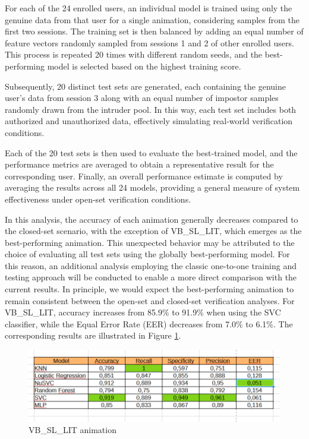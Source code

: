 \documentclass{article}
\begin{document}
For each of the 24 enrolled users, an individual model is trained using only the genuine data from that user for a single animation, considering samples from the first two sessions.
The training set is then balanced by adding an equal number of feature vectors randomly sampled from sessions 1 and 2 of other enrolled users.
This process is repeated 20 times with different random seeds, and the best-performing model is selected based on the highest training score.

Subsequently, 20 distinct test sets are generated, each containing the genuine user's data from session 3 along with an equal number of impostor samples randomly drawn from the intruder pool.
In this way, each test set includes both authorized and unauthorized data, effectively simulating real-world verification conditions.

Each of the 20 test sets is then used to evaluate the best-trained model, and the performance metrics are averaged to obtain a representative result for the corresponding user.
Finally, an overall performance estimate is computed by averaging the results across all 24 models, providing a general measure of system effectiveness under open-set verification conditions.

In this analysis, the accuracy of each animation generally decreases compared to the closed-set scenario, with the exception of VB\_SL\_LIT, which emerges as the best-performing animation.
This unexpected behavior may be attributed to the choice of evaluating all test sets using the globally best-performing model.
For this reason, an additional analysis employing the classic one-to-one training and testing approach will be conducted to enable a more direct comparison with the current results.
In principle, we would expect the best-performing animation to remain consistent between the open-set and closed-set verification analyses.
For VB\_SL\_LIT, accuracy increases from 85.9\% to 91.9\% when using the SVC classifier, while the Equal Error Rate (EER) decreases from 7.0\% to 6.1\%.
The corresponding results are illustrated in Figure \ref{fig:VB_SL_LIT_sti}.

\begin{figure}[ht]
    \centering
    \includegraphics[width = 0.8
    \textwidth]{Images/Results/Verification_single_intruders/st/VB_SL_LIT.png}
    \caption{VB\_SL\_LIT animation}
    \label{fig:VB_SL_LIT_sti}
\end{figure}
\end{document}
